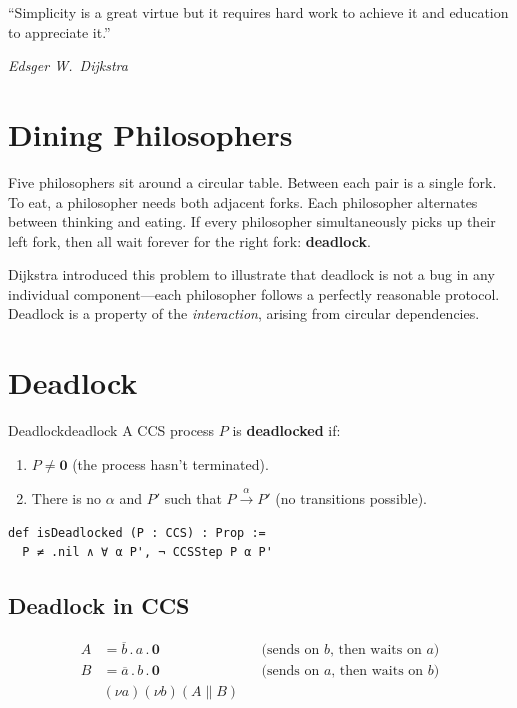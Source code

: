\documentclass[11pt, a4paper, oneside]{book}
\newcommand{\nil}{\mathbf{0}}
\newcommand{\Par}{\mathbin{\|}}
\newcommand{\pref}{\mathbin{.}}
\newcommand{\res}[1]{(\nu #1)}
\begin{document}
\epigraph{``Simplicity is a great virtue but it requires hard work to achieve
it and education to appreciate it.''}{\textit{Edsger W.\ Dijkstra}}

\section{Dining Philosophers}

\begin{historical}[title={Dijkstra's Dining Philosophers (1971)}]
Five philosophers sit around a circular table. Between each pair is a single
fork. To eat, a philosopher needs both adjacent forks. Each philosopher
alternates between thinking and eating. If every philosopher simultaneously
picks up their left fork, then all wait forever for the right fork:
\textbf{deadlock}.

Dijkstra introduced this problem to illustrate that deadlock is not a bug in
any individual component---each philosopher follows a perfectly reasonable
protocol. Deadlock is a property of the \emph{interaction}, arising from
circular dependencies.
\end{historical}

\section{Deadlock}

\begin{defn}{Deadlock}{deadlock}
A CCS process $P$ is \textbf{deadlocked} if:
\begin{enumerate}[nosep, label=(\roman*)]
\item $P \neq \nil$ (the process hasn't terminated).
\item There is no $\alpha$ and $P'$ such that $P \xrightarrow{\alpha} P'$
  (no transitions possible).
\end{enumerate}
\end{defn}

\begin{leanbox}
\begin{verbatim}
def isDeadlocked (P : CCS) : Prop :=
  P ≠ .nil ∧ ∀ α P', ¬ CCSStep P α P'
\end{verbatim}
\end{leanbox}

\subsection{Deadlock in CCS}

\begin{align*}
  A &= \overline{b} \pref a \pref \nil &&\text{(sends on $b$, then waits on $a$)} \\
  B &= \overline{a} \pref b \pref \nil &&\text{(sends on $a$, then waits on $b$)} \\[4pt]
  &\res{a}\res{b}(A \Par B)
\end{align*}
\end{document}
